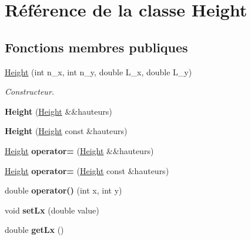 \hypertarget{class_height}{}\section{Référence de la classe Height}
\label{class_height}
\subsection*{Fonctions membres publiques}
\begin{DoxyCompactItemize}
\item 
\hyperlink{class_height_af4c985463352fc7f3dd6b00574ef865b}{Height} (int n\+\_\+x, int n\+\_\+y, double L\+\_\+x, double L\+\_\+y)
\begin{DoxyCompactList}\small\item\em Constructeur. \end{DoxyCompactList}\item 
\mbox{\label{class_height_a39b74091414bcb55a3d9023cab5496f4}} 
{\bfseries Height} (\hyperlink{class_height}{Height} \&\&hauteurs)
\item 
\mbox{\label{class_height_a0d36a635165e5b77d0034aaef6b895dc}} 
{\bfseries Height} (\hyperlink{class_height}{Height} const \&hauteurs)
\item 
\mbox{\label{class_height_aab8a602d0a015dba9526361a635cf912}} 
\hyperlink{class_height}{Height} {\bfseries operator=} (\hyperlink{class_height}{Height} \&\&hauteurs)
\item 
\mbox{\label{class_height_a1abcb7d9d453779226a2f211d4c1f5c5}} 
\hyperlink{class_height}{Height} {\bfseries operator=} (\hyperlink{class_height}{Height} const \&hauteurs)
\item 
\mbox{\label{class_height_af946b05c8753d5240a7719d5716b851e}} 
double {\bfseries operator()} (int x, int y)
\item 
\mbox{\label{class_height_a4bac735463fe0500e533a651afacf19d}} 
void {\bfseries set\+Lx} (double value)
\item 
\mbox{\label{class_height_a8edebe5c97f6adb896865d46c1d355f6}} 
double {\bfseries get\+Lx} ()
\item 

\end{DoxyCompactItemize}
